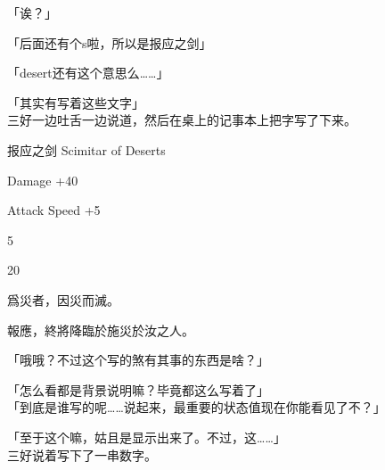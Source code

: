 「诶？」

「后面还有个s啦，所以是报应之剑」

「desert还有这个意思么……」

「其实有写着这些文字」\\

三好一边吐舌一边说道，然后在桌上的记事本上把字写了下来。\\

\cardline

  报应之剑  Scimitar of Deserts

%  
 

  Damage +40%

  Attack Speed +5%

  5%

  20%

%  
 

  爲災者，因災而滅。

  報應，終將降臨於施災於汝之人。

\cardline

「哦哦？不过这个写的煞有其事的东西是啥？」

「怎么看都是背景说明嘛？毕竟都这么写着了」\\

「到底是谁写的呢……说起来，最重要的状态值现在你能看见了不？」

「至于这个嘛，姑且是显示出来了。不过，这……」\\

三好说着写下了一串数字。\\

